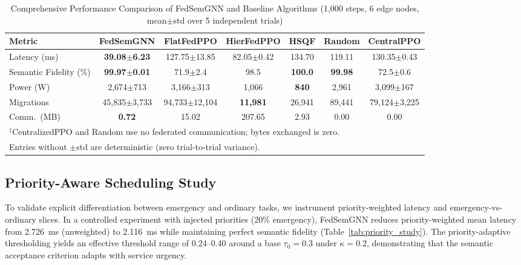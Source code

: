 \documentclass[conference]{IEEEtran}
\begin{document}
	\begin{table}[htbp]
		\centering
		\caption{Comprehensive Performance Comparison of FedSemGNN and Baseline Algorithms (1{,}000 steps, 6 edge nodes, mean$\pm$std over 5 independent trials)}
		\label{tab:performance_comparison}
		\small
		\begin{tabular}{lcccccc}
			\toprule
			\textbf{Metric} & \textbf{FedSemGNN} & \textbf{FlatFedPPO} & \textbf{HierFedPPO} & \textbf{HSQF} & \textbf{Random} & \textbf{CentralPPO} \\
			\midrule
			Latency (ms) & \textbf{39.08$\pm$6.23} & 127.75$\pm$13.85 & 82.05$\pm$0.42 & 134.70 & 119.11 & 130.35$\pm$0.43 \\
			Semantic Fidelity (\%) & \textbf{99.97$\pm$0.01} & 71.9$\pm$2.4 & 98.5 & \textbf{100.0} & \textbf{99.98} & 72.5$\pm$0.6 \\
			Power (W) & 2{,}674$\pm$713 & 3{,}166$\pm$313 & 1{,}066 & \textbf{840} & 2{,}961 & 3{,}099$\pm$167 \\
			Migrations & 45{,}835$\pm$3{,}733 & 94{,}733$\pm$12{,}104 & \textbf{11{,}981} & 26{,}941 & 89{,}441 & 79{,}124$\pm$3{,}225 \\
			Comm.\ (MB) & \textbf{0.72} & 15.02 & 207.65 & 2.93 & 0.00 & 0.00 \\
			\bottomrule
			\multicolumn{7}{l}{\footnotesize $^\ddagger$CentralizedPPO and Random use no federated communication; bytes exchanged is zero.}\\
			\multicolumn{7}{l}{\footnotesize Entries without $\pm$std are deterministic (zero trial-to-trial variance).}\\
		\end{tabular}
	\end{table}

	\subsection{Priority-Aware Scheduling Study}
	\textcolor{revblue}{To validate explicit differentiation between emergency and ordinary tasks, we instrument priority-weighted latency and emergency-vs-ordinary slices. In a controlled experiment with injected priorities (20\% emergency), FedSemGNN reduces priority-weighted mean latency from 2.726~ms (unweighted) to 2.116~ms while maintaining perfect semantic fidelity (Table~\ref{tab:priority_study}). The priority-adaptive thresholding yields an effective threshold range of 0.24--0.40 around a base $\tau_0{=}0.3$ under $\kappa{=}0.2$, demonstrating that the semantic acceptance criterion adapts with service urgency.}
\end{document}
